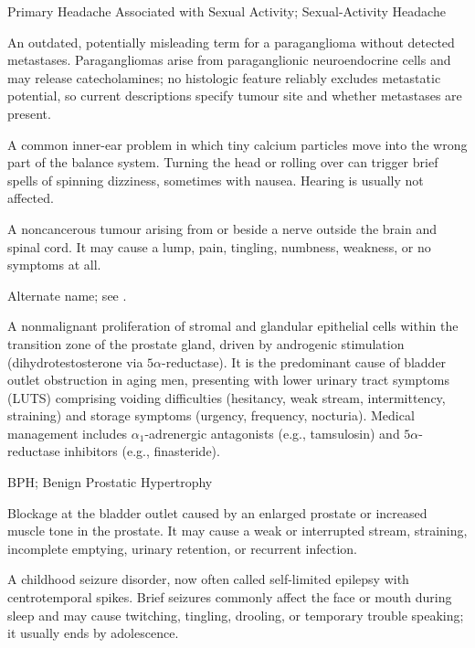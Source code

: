 \synonyms
Primary Headache Associated with Sexual Activity; Sexual-Activity Headache

 An outdated, potentially misleading term for a paraganglioma without detected metastases. Paragangliomas arise from paraganglionic neuroendocrine cells and may release catecholamines; no histologic feature reliably excludes metastatic potential, so current descriptions specify tumour site and whether metastases are present.

 A common inner-ear problem in which tiny calcium particles move into the wrong part of the balance system. Turning the head or rolling over can trigger brief spells of spinning dizziness, sometimes with nausea. Hearing is usually not affected.

 A noncancerous tumour arising from or beside a nerve outside the brain and spinal cord. It may cause a lump, pain, tingling, numbness, weakness, or no symptoms at all.

 Alternate name; see .

 A nonmalignant proliferation of stromal and glandular epithelial cells within the transition zone of the prostate gland, driven by androgenic stimulation (dihydrotestosterone via $5\alpha$-reductase). It is the predominant cause of bladder outlet obstruction in aging men, presenting with lower urinary tract symptoms (LUTS) comprising voiding difficulties (hesitancy, weak stream, intermittency, straining) and storage symptoms (urgency, frequency, nocturia). Medical management includes $\alpha_1$-adrenergic antagonists (e.g., tamsulosin) and $5\alpha$-reductase inhibitors (e.g., finasteride).

\synonyms
BPH; Benign Prostatic Hypertrophy

 Blockage at the bladder outlet caused by an enlarged prostate or increased muscle tone in the prostate. It may cause a weak or interrupted stream, straining, incomplete emptying, urinary retention, or recurrent infection.

 A childhood seizure disorder, now often called self-limited epilepsy with centrotemporal spikes. Brief seizures commonly affect the face or mouth during sleep and may cause twitching, tingling, drooling, or temporary trouble speaking; it usually ends by adolescence.

